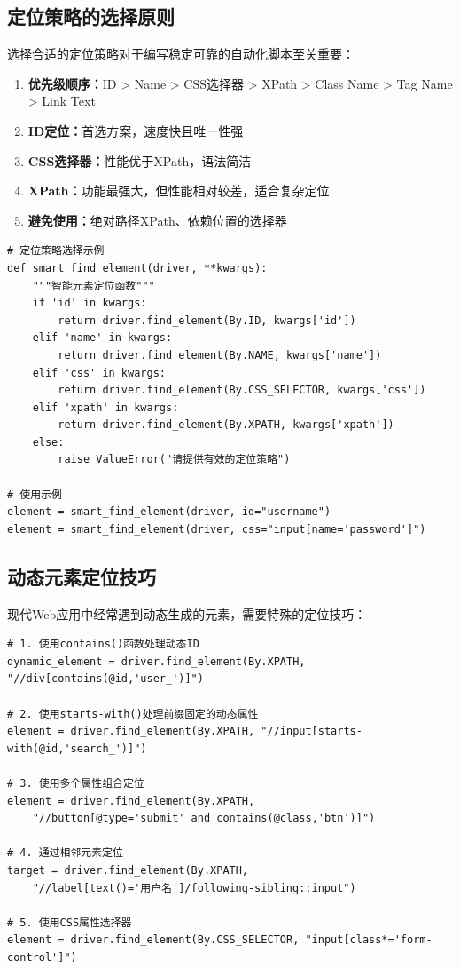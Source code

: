 \subsection{定位策略的选择原则}

选择合适的定位策略对于编写稳定可靠的自动化脚本至关重要：

\begin{enumerate}
    \item \textbf{优先级顺序：}ID > Name > CSS选择器 > XPath > Class Name > Tag Name > Link Text
    \item \textbf{ID定位：}首选方案，速度快且唯一性强
    \item \textbf{CSS选择器：}性能优于XPath，语法简洁
    \item \textbf{XPath：}功能最强大，但性能相对较差，适合复杂定位
    \item \textbf{避免使用：}绝对路径XPath、依赖位置的选择器
\end{enumerate}

\begin{lstlisting}[style=demostyle,numbers=none]
# 定位策略选择示例
def smart_find_element(driver, **kwargs):
    """智能元素定位函数"""
    if 'id' in kwargs:
        return driver.find_element(By.ID, kwargs['id'])
    elif 'name' in kwargs:
        return driver.find_element(By.NAME, kwargs['name'])
    elif 'css' in kwargs:
        return driver.find_element(By.CSS_SELECTOR, kwargs['css'])
    elif 'xpath' in kwargs:
        return driver.find_element(By.XPATH, kwargs['xpath'])
    else:
        raise ValueError("请提供有效的定位策略")

# 使用示例
element = smart_find_element(driver, id="username")
element = smart_find_element(driver, css="input[name='password']")
\end{lstlisting}

\subsection{动态元素定位技巧}

现代Web应用中经常遇到动态生成的元素，需要特殊的定位技巧：

\begin{lstlisting}[style=demostyle,numbers=none]
# 1. 使用contains()函数处理动态ID
dynamic_element = driver.find_element(By.XPATH, "//div[contains(@id,'user_')]")

# 2. 使用starts-with()处理前缀固定的动态属性
element = driver.find_element(By.XPATH, "//input[starts-with(@id,'search_')]")

# 3. 使用多个属性组合定位
element = driver.find_element(By.XPATH, 
    "//button[@type='submit' and contains(@class,'btn')]")

# 4. 通过相邻元素定位
target = driver.find_element(By.XPATH, 
    "//label[text()='用户名']/following-sibling::input")

# 5. 使用CSS属性选择器
element = driver.find_element(By.CSS_SELECTOR, "input[class*='form-control']")
\end{lstlisting}

